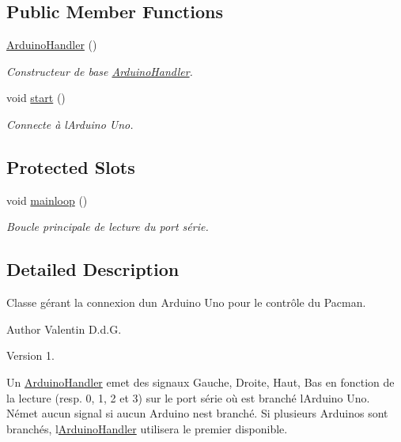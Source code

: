 \subsection*{Public Member Functions}
\begin{DoxyCompactItemize}
\item 
\hyperlink{class_arduino_handler_add27f10e1b41f677d1810ddabc5e8870}{Arduino\+Handler} ()
\begin{DoxyCompactList}\small\item\em Constructeur de base \hyperlink{class_arduino_handler}{Arduino\+Handler}. \end{DoxyCompactList}\item 
void \hyperlink{class_arduino_handler_a15d8970b79dd96b1a0b0fdd118b0793f}{start} ()
\begin{DoxyCompactList}\small\item\em Connecte à l\textquotesingle{}Arduino Uno. \end{DoxyCompactList}\end{DoxyCompactItemize}
\subsection*{Protected Slots}
\begin{DoxyCompactItemize}
\item 
void \hyperlink{class_arduino_handler_a2b34ab08c171c918bc711c93810dadde}{mainloop} ()
\begin{DoxyCompactList}\small\item\em Boucle principale de lecture du port série. \end{DoxyCompactList}\end{DoxyCompactItemize}


\subsection{Detailed Description}
Classe gérant la connexion d\textquotesingle{}un Arduino Uno pour le contrôle du Pacman. 

\begin{DoxyAuthor}{Author}
Valentin D.\+d.\+G. 
\end{DoxyAuthor}
\begin{DoxyVersion}{Version}
1.
\end{DoxyVersion}
Un \hyperlink{class_arduino_handler}{Arduino\+Handler} emet des signaux Gauche, Droite, Haut, Bas en fonction de la lecture (resp. \textquotesingle{}0\textquotesingle{}, \textquotesingle{}1\textquotesingle{}, \textquotesingle{}2\textquotesingle{} et \textquotesingle{}3\textquotesingle{}) sur le port série où est branché l\textquotesingle{}Arduino Uno. N\textquotesingle{}émet aucun signal si aucun Arduino n\textquotesingle{}est branché. Si plusieurs Arduinos sont branchés, l\textquotesingle{}\hyperlink{class_arduino_handler}{Arduino\+Handler} utilisera le premier disponible. 

